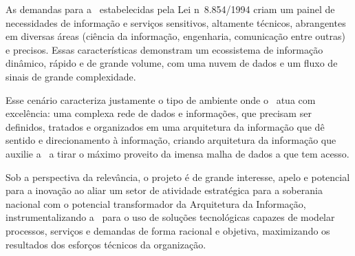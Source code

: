 
As demandas para a \siglacntrt\ estabelecidas pela Lei n\ele\ 8.854/1994 criam um painel de necessidades de informação e serviços sensitivos, altamente técnicos, abrangentes em diversas áreas (ciência da informação, engenharia, comunicação entre outras) e precisos. Essas características demonstram um ecossistema de informação dinâmico, rápido e de grande volume, com uma nuvem de dados e um fluxo de sinais de grande complexidade.

Esse cenário caracteriza justamente o tipo de ambiente onde o \cpai\ atua com excelência: uma complexa rede de dados e informações, que precisam ser definidos, tratados e organizados em uma arquitetura da informação que dê sentido e direcionamento à informação, criando arquitetura da informação que auxilie a \siglacntrt\ a tirar o máximo proveito da imensa malha de dados a que tem acesso.

Sob a perspectiva da relevância, o projeto é de grande interesse, apelo e potencial para a inovação ao aliar um setor de atividade estratégica para a soberania nacional com o potencial transformador da Arquitetura da Informação, instrumentalizando a \siglacntrt\ para o uso de soluções tecnológicas capazes de modelar processos, serviços e demandas de forma racional e objetiva, maximizando os resultados dos esforços técnicos da organização.
